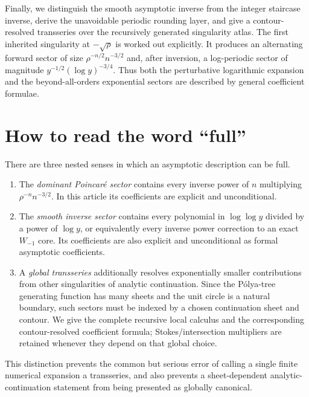 \documentclass[11pt,a4paper,oneside,openany]{book}
\theoremstyle{definition}
\theoremstyle{remark}
\begin{document}
Finally, we distinguish the smooth asymptotic inverse from the integer
staircase inverse, derive the unavoidable periodic rounding layer, and give a
contour-resolved transseries over the recursively generated singularity atlas.
The first inherited singularity at $-\sqrt\rho$ is worked out explicitly.  It
produces an alternating forward sector of size $\rho^{-n/2}n^{-3/2}$ and, after
inversion, a log-periodic sector of magnitude
$y^{-1/2}(\log y)^{-3/4}$.  Thus both the perturbative logarithmic expansion and
the beyond-all-orders exponential sectors are described by general coefficient
formulae.

\chapter*{How to read the word ``full''}
There are three nested senses in which an asymptotic description can be full.
\begin{enumerate}
\item The \emph{dominant Poincar\'e sector} contains every inverse power of $n$
      multiplying $\rho^{-n}n^{-3/2}$.  In this article its coefficients are
      explicit and unconditional.
\item The \emph{smooth inverse sector} contains every polynomial in
      $\log\log y$ divided by a power of $\log y$, or equivalently every inverse
      power correction to an exact $W_{-1}$ core.  Its coefficients are also
      explicit and unconditional as formal asymptotic coefficients.
\item A \emph{global transseries} additionally resolves exponentially smaller
      contributions from other singularities of analytic continuation.  Since
      the P\'olya-tree generating function has many sheets and the unit circle
      is a natural boundary, such sectors must be indexed by a chosen
      continuation sheet and contour.  We give the complete recursive local
      calculus and the corresponding contour-resolved coefficient formula;
      Stokes/intersection multipliers are retained whenever they depend on that
      global choice.
\end{enumerate}
This distinction prevents the common but serious error of calling a single
finite numerical expansion a transseries, and also prevents a sheet-dependent
analytic-continuation statement from being presented as globally canonical.

\tableofcontents

\mainmatter
\end{document}
